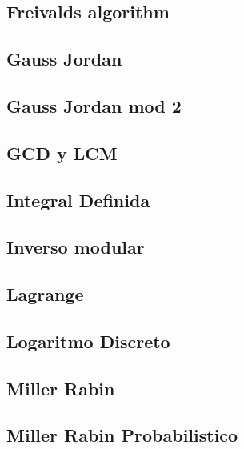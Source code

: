 \subsection{Freivalds algorithm}
\raggedbottom
\hrulefill
\subsection{Gauss Jordan}
\raggedbottom
\hrulefill
\subsection{Gauss Jordan mod 2}
\raggedbottom
\hrulefill
\subsection{GCD y LCM}
\raggedbottom
\hrulefill
\subsection{Integral Definida}
\raggedbottom
\hrulefill
\subsection{Inverso modular}
\raggedbottom
\hrulefill
\subsection{Lagrange}
\raggedbottom
\hrulefill
\subsection{Logaritmo Discreto}
\raggedbottom
\hrulefill
\subsection{Miller Rabin}
\raggedbottom
\hrulefill
\subsection{Miller Rabin Probabilistico}
\raggedbottom
\hrulefill
